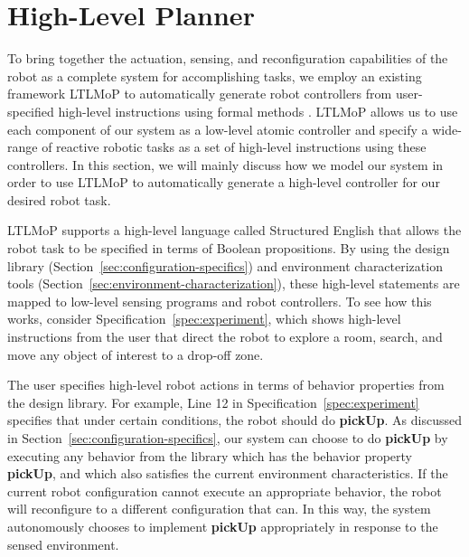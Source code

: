 \documentclass[conference]{IEEEtran}
\newcommand{\lt}{{\tt True }}
\newcommand{\lf}{{\tt False }}
\begin{document}
\section{High-Level Planner}
\label{sec:high-level}

To bring together the actuation, sensing, and reconfiguration capabilities of  the  robot as a complete system for accomplishing  tasks, we employ an existing framework LTLMoP to automatically generate robot controllers from user-specified high-level instructions using formal methods \cite{DBLP:conf/iros/FinucaneJK10,DBLP:journals/trob/Kress-GazitFP09}.
LTLMoP allows us to use each component of our system as a low-level atomic controller and specify a wide-range of reactive robotic tasks as a set of high-level instructions using these controllers.
In this section, we will mainly discuss how we model our system in order to use LTLMoP to automatically generate a high-level controller for our desired robot task.

LTLMoP supports a high-level language called Structured English that allows the robot task to be specified in terms of Boolean propositions.
By using the design library (Section~\ref{sec:configuration-specifics})  and environment characterization tools (Section~\ref{sec:environment-characterization}), these high-level statements are mapped to low-level sensing programs and robot controllers.
To see how this works, consider Specification~\ref{spec:experiment}, which shows  high-level instructions from the user that direct the robot to explore a room, search, and move any object of interest to a drop-off zone.

The user specifies high-level robot actions in terms of behavior properties from the design library.  For example, Line 12 in Specification~\ref{spec:experiment} specifies that under certain conditions, the robot should do \textbf{pickUp}.  As discussed in Section~\ref{sec:configuration-specifics}, our system can choose to do \textbf{pickUp} by executing any behavior from the library which has the behavior property \textbf{pickUp}, and which also satisfies the current environment characteristics. If the current robot configuration cannot execute an appropriate behavior, the robot will reconfigure to a different configuration that can.  In this way, the system autonomously chooses to implement  \textbf{pickUp}  appropriately in response to the sensed environment.
\end{document}
